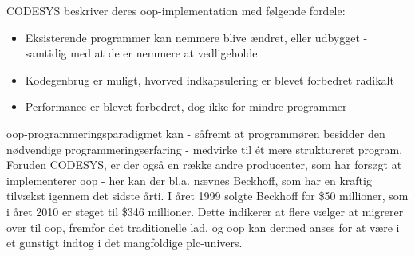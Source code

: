 
CODESYS beskriver deres \gls{oop}-implementation med følgende fordele\cite{codesys-oop-benefits}:
\begin{itemize}
\item Eksisterende programmer kan nemmere blive ændret, eller udbygget - samtidig med at de er nemmere at vedligeholde
\item Kodegenbrug er muligt, hvorved indkapsulering er blevet forbedret radikalt
\item Performance er blevet forbedret, dog ikke for mindre programmer
\end{itemize}

\noindent\gls{oop}-programmeringsparadigmet kan - såfremt at programmøren besidder den nødvendige programmeringserfaring - medvirke til ét mere struktureret program. Foruden CODESYS, er der også en række andre producenter, som har forsøgt at implementerer \gls{oop} - her kan der bl.a. nævnes Beckhoff, som har en kraftig tilvækst igennem det sidste årti. I året 1999 solgte Beckhoff for \$50 millioner, som i året 2010 er steget til \$346 millioner. Dette indikerer at flere vælger at migrerer over til \gls{oop}, fremfor det traditionelle \gls{lad}, og \gls{oop} kan dermed anses for at være i et gunstigt indtog i det mangfoldige \gls{plc}-univers\cite{beckhoff-sold}.





















